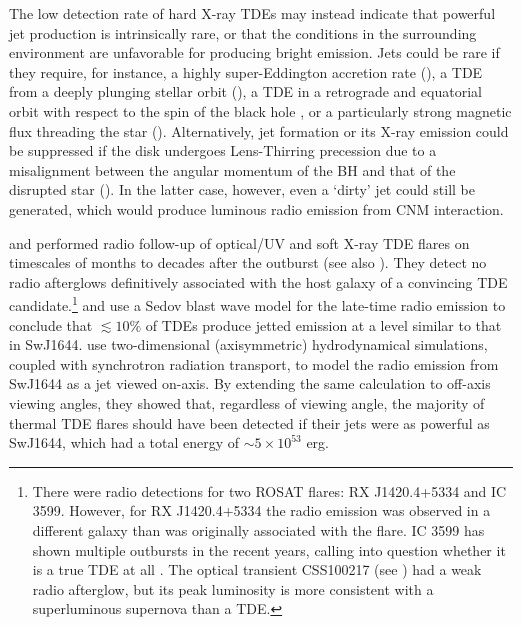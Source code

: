 \documentclass[usenatbib,fleqn]{mnras}
\begin{document}
The low detection rate of hard X-ray TDEs may instead indicate that powerful
jet production is intrinsically rare, or that the conditions in
the surrounding environment are unfavorable for producing bright
emission.  Jets could be rare if they require, for instance, a highly
super-Eddington accretion rate (\citealt{De-Colle+2012}), a TDE from a
deeply plunging stellar orbit (\citealt{Metzger&Stone2015}), a TDE in
a retrograde and equatorial orbit with respect to the spin of the
black hole \citep{Parfrey+2015}, or a particularly strong magnetic
flux threading the star (\citealt{Tchekhovskoy+2014,Kelley+2014}).
Alternatively, jet formation or its X-ray emission could be suppressed
if the disk undergoes Lens-Thirring precession due to a misalignment
between the angular momentum of the BH and that of the disrupted star
(\citealt{Stone&Loeb2012}).  In the latter case, however, even a
`dirty' jet could still be generated, which would produce luminous
radio emission from CNM interaction.

\citet{Bower+2013} and \citet{van-Velzen+2013} performed radio
follow-up of optical/UV and soft X-ray TDE flares on timescales of
months to decades after the outburst (see also
\citealt{Arcavi+2014}). They detect no radio afterglows definitively
associated with the host galaxy of a convincing TDE
candidate.\footnote{There were radio detections for two ROSAT flares:
  RX J1420.4+5334 and IC 3599. However, for RX J1420.4+5334 the radio
  emission was observed in a different galaxy than was originally
  associated with the flare.  IC 3599 has shown multiple outbursts in
  the recent years, calling into question whether it is a true TDE at
  all \citep{Campana+2015}. The optical transient CSS100217 (see
  \citealt{Drake+2011}) had a weak radio afterglow, but its peak
  luminosity is more consistent with a superluminous supernova than a
  TDE.} \citet{Bower+2013} and \citet{van-Velzen+2013} use a Sedov
blast wave model for the late-time radio emission to conclude that
$\lesssim 10\%$ of TDEs produce jetted emission at a level similar to
that in SwJ1644.  \citet{Mimica+2015} use two-dimensional
(axisymmetric) hydrodynamical simulations, coupled with synchrotron
radiation transport, to model the radio emission from SwJ1644 as a jet
viewed on-axis.  By extending the same calculation to off-axis viewing
angles, they showed that, regardless of viewing angle, the majority of
thermal TDE flares should have been detected if their jets were as
powerful as SwJ1644, which had a total energy of $\sim 5\times
10^{53}$ erg.
\end{document}
